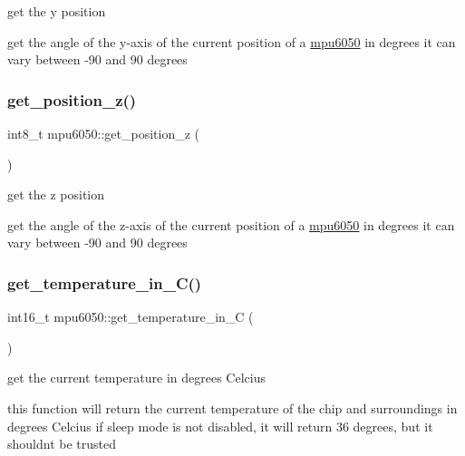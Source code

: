get the y position 

get the angle of the y-\/axis of the current position of a \hyperlink{classmpu6050}{mpu6050} in degrees it can vary between -\/90 and 90 degrees \mbox{\label{classmpu6050_aaac23fed6c6abfc50a5e41c5fdcd22e8}} 
\subsubsection{\texorpdfstring{get\+\_\+position\+\_\+z()}{get\_position\_z()}}
{\footnotesize\ttfamily int8\+\_\+t mpu6050\+::get\+\_\+position\+\_\+z (\begin{DoxyParamCaption}{ }\end{DoxyParamCaption})\hspace{0.3cm}{\ttfamily [inline]}}



get the z position 

get the angle of the z-\/axis of the current position of a \hyperlink{classmpu6050}{mpu6050} in degrees it can vary between -\/90 and 90 degrees \mbox{\label{classmpu6050_ab4e29f1ab6bd4ed7aa4f6ba0a4874c6a}} 
\subsubsection{\texorpdfstring{get\+\_\+temperature\+\_\+in\+\_\+\+C()}{get\_temperature\_in\_C()}}
{\footnotesize\ttfamily int16\+\_\+t mpu6050\+::get\+\_\+temperature\+\_\+in\+\_\+C (\begin{DoxyParamCaption}{ }\end{DoxyParamCaption})\hspace{0.3cm}{\ttfamily [inline]}}



get the current temperature in degrees Celcius 

this function will return the current temperature of the chip and surroundings in degrees Celcius if sleep mode is not disabled, it will return 36 degrees, but it shouldn\textquotesingle{}t be trusted \mbox{\label{classmpu6050_a3dd7248a256c2d7f7f465fdc5e4e5da8}} 
